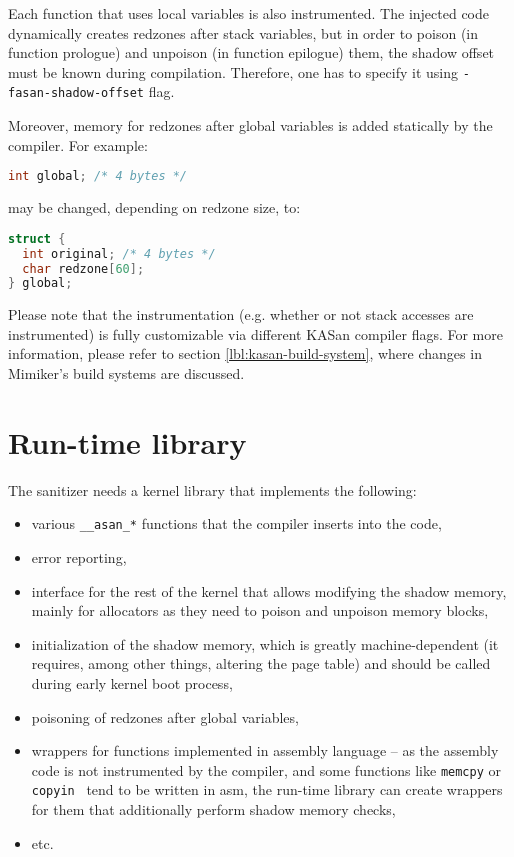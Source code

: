 \documentclass[shortabstract, manyadvisors, english, mgr]{iithesis}
\theoremstyle{definition} \newtheorem*{definition}{Definicja}
\theoremstyle{definition} \newtheorem*{example}{Przykład}
\theoremstyle{definition} \newtheorem*{remark}{Uwaga}
\begin{document}
Each function that uses local variables is also instrumented. The injected code dynamically creates redzones after stack variables, but in order to poison (in function prologue) and unpoison (in function epilogue) them, the shadow offset must be known during compilation. Therefore, one has to specify it using \texttt{-fasan-shadow-offset} flag.

Moreover, memory for redzones after global variables is added statically by the compiler. For example:
\begin{lstlisting}[language=C]
int global; /* 4 bytes */
\end{lstlisting}
may be changed, depending on redzone size, to:
\begin{lstlisting}[language=C]
struct {
  int original; /* 4 bytes */
  char redzone[60];
} global;
\end{lstlisting}

Please note that the instrumentation (e.g. whether or not stack accesses are instrumented) is fully customizable via different KASan compiler flags. For more information, please refer to section \ref{lbl:kasan-build-system}, where changes in Mimiker's build systems are discussed.

\section{Run-time library}
\label{lbl:chapter-4-run-time}
The sanitizer needs a kernel library that implements the following:
\begin{itemize}
    \item various \texttt{\_\_asan\_*} functions that the compiler inserts into the code,
    \item error reporting,
    \item interface for the rest of the kernel that allows modifying the shadow memory, mainly for allocators as they need to poison and unpoison memory blocks,
    \item initialization of the shadow memory, which is greatly machine-dependent (it requires, among other things, altering the page table) and should be called during early kernel boot process,
    \item poisoning of redzones after global variables, 
    \item wrappers for functions implemented in assembly language -- as the assembly code is not instrumented by the compiler, and some functions like \texttt{memcpy} or \texttt{copyin}~\cite{bib:copy-bsd} tend to be written in asm, the run-time library can create wrappers for them that additionally perform shadow memory checks,
    \item etc.
\end{itemize}
\end{document}
